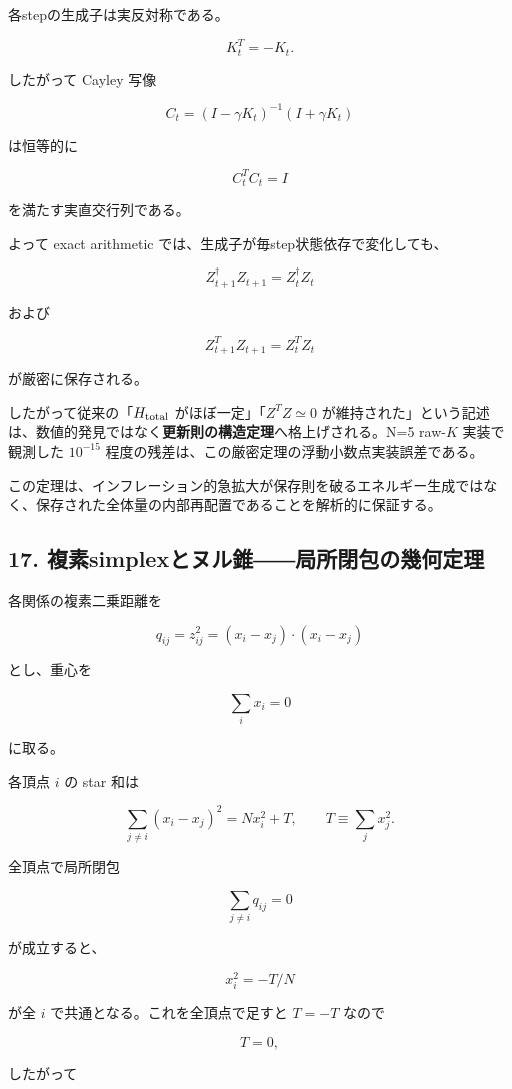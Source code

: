 \documentclass[
  a4paper,
]{ltjsarticle}
\begin{document}
各stepの生成子は実反対称である。

\[
K_t^T=-K_t.
\]

したがって Cayley 写像

\[
C_t=(I-\gamma K_t)^{-1}(I+\gamma K_t)
\]

は恒等的に

\[
C_t^T C_t=I
\]

を満たす実直交行列である。

よって exact arithmetic では、生成子が毎step状態依存で変化しても、

\[
\boxed{Z_{t+1}^\dagger Z_{t+1}=Z_t^\dagger Z_t}
\]

および

\[
\boxed{Z_{t+1}^T Z_{t+1}=Z_t^T Z_t}
\]

が厳密に保存される。

したがって従来の「\(H_{\rm total}\) がほぼ一定」「\(Z^TZ\simeq0\)
が維持された」という記述は、数値的発見ではなく\textbf{更新則の構造定理}へ格上げされる。N=5
raw-\(K\) 実装で観測した \(10^{-15}\)
程度の残差は、この厳密定理の浮動小数点実装誤差である。

この定理は、インフレーション的急拡大が保存則を破るエネルギー生成ではなく、保存された全体量の内部再配置であることを解析的に保証する。

\subsection{17.
複素simplexとヌル錐――局所閉包の幾何定理}\label{ux8907ux7d20simplexux3068ux30ccux30ebux9310ux5c40ux6240ux9589ux5305ux306eux5e7eux4f55ux5b9aux7406}

各関係の複素二乗距離を

\[
q_{ij}=z_{ij}^2=(x_i-x_j)\cdot(x_i-x_j)
\]

とし、重心を

\[
\sum_i x_i=0
\]

に取る。

各頂点 \(i\) の star 和は

\[
\sum_{j\ne i}(x_i-x_j)^2
=Nx_i^2+T,
\qquad
T\equiv\sum_jx_j^2.
\]

全頂点で局所閉包

\[
\sum_{j\ne i}q_{ij}=0
\]

が成立すると、

\[
x_i^2=-T/N
\]

が全 \(i\) で共通となる。これを全頂点で足すと \(T=-T\) なので

\[
T=0,
\]

したがって
\end{document}
